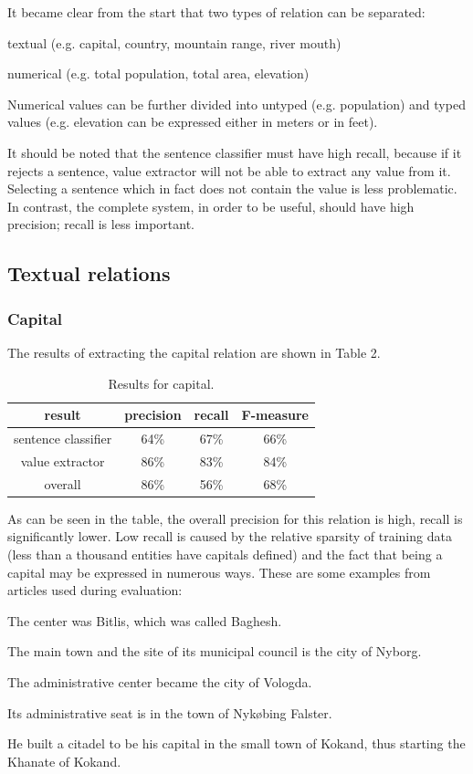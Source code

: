 \documentclass[10pt,a5paper,twoside]{article}
\begin{document}
It became clear from the start that two types of relation can be separated:
\begin{compactitem}
    \item textual (e.g. capital, country, mountain range, river mouth)
    \item numerical (e.g. total population, total area, elevation)
\end{compactitem}
Numerical values can be further divided into untyped (e.g. population) and typed values (e.g. elevation can be expressed either in meters or in feet).

It should be noted that the sentence classifier must have high recall, because if it rejects a sentence, value extractor will not be able to extract any value from it. Selecting a sentence which in fact does not
contain the value is less problematic. In contrast, the complete system, in order to be useful, should have high precision; recall is less important.

\subsection{Textual relations}
\subsubsection{Capital}
The results of extracting the capital relation are shown in Table 2.
\begin{table}[!h]
\centering
\begin{tabular}{ | c | c | c | c | }
    \hline
    result & precision & recall & F-measure \\ \hline \hline
    sentence classifier & 64\% & 67\% & 66\% \\ \hline
    value extractor     & 86\% & 83\% & 84\% \\ \hline
    overall             & 86\% & 56\% & 68\% \\ \hline
\end{tabular}
\caption{Results for capital.}
\end{table}

As can be seen in the table, the overall precision for this relation is high, recall is significantly lower. Low recall is caused by the relative sparsity of training data (less than a thousand entities have capitals defined) and the fact that being a capital may be expressed in numerous ways. These are some examples from articles used during evaluation:
\begin{compactitem}
    \item The center was Bitlis, which was called Baghesh.
    \item The main town and the site of its municipal council is the city of Nyborg.
    \item The administrative center became the city of Vologda.
    \item Its administrative seat is in the town of Nykøbing Falster.
    \item He built a citadel to be his capital in the small town of Kokand, thus starting the Khanate of Kokand.
\end{compactitem}
\end{document}
